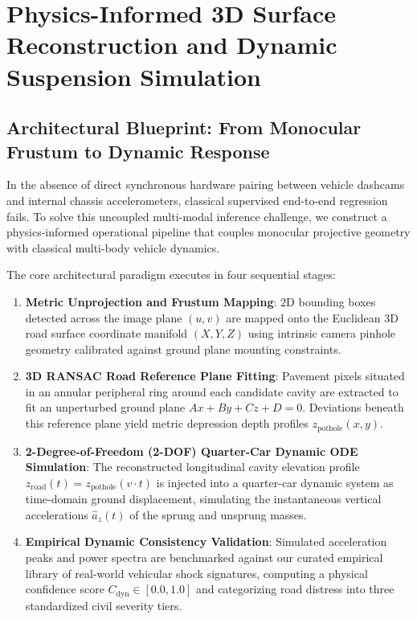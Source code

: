 \section{Physics-Informed 3D Surface Reconstruction and Dynamic Suspension Simulation}
\label{sec:3d_reconstruction_and_simulation}

\subsection{Architectural Blueprint: From Monocular Frustum to Dynamic Response}
In the absence of direct synchronous hardware pairing between vehicle dashcams and internal chassis accelerometers, classical supervised end-to-end regression fails. To solve this uncoupled multi-modal inference challenge, we construct a physics-informed operational pipeline that couples monocular projective geometry with classical multi-body vehicle dynamics. 

The core architectural paradigm executes in four sequential stages:
\begin{enumerate}
    \item \textbf{Metric Unprojection and Frustum Mapping}: 2D bounding boxes detected across the image plane $(u, v)$ are mapped onto the Euclidean 3D road surface coordinate manifold $(X, Y, Z)$ using intrinsic camera pinhole geometry calibrated against ground plane mounting constraints.
    \item \textbf{3D RANSAC Road Reference Plane Fitting}: Pavement pixels situated in an annular peripheral ring around each candidate cavity are extracted to fit an unperturbed ground plane $Ax + By + Cz + D = 0$. Deviations beneath this reference plane yield metric depression depth profiles $z_{\text{pothole}}(x, y)$.
    \item \textbf{2-Degree-of-Freedom (2-DOF) Quarter-Car Dynamic ODE Simulation}: The reconstructed longitudinal cavity elevation profile $z_{\text{road}}(t) = z_{\text{pothole}}(v \cdot t)$ is injected into a quarter-car dynamic system as time-domain ground displacement, simulating the instantaneous vertical accelerations $\hat{a}_z(t)$ of the sprung and unsprung masses.
    \item \textbf{Empirical Dynamic Consistency Validation}: Simulated acceleration peaks and power spectra are benchmarked against our curated empirical library of real-world vehicular shock signatures, computing a physical confidence score $C_{\text{dyn}} \in [0.0, 1.0]$ and categorizing road distress into three standardized civil severity tiers.
\end{enumerate}

